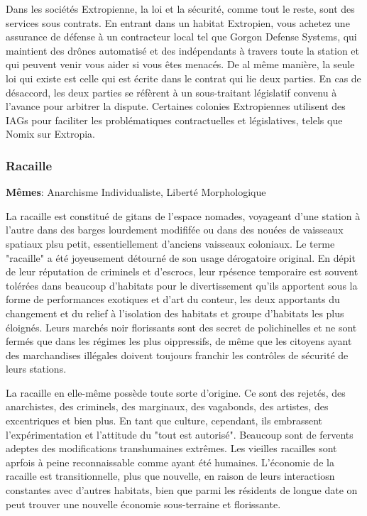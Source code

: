 Dans les sociétés Extropienne, la loi et la sécurité, comme tout le reste, sont des services sous contrats. En entrant dans un habitat Extropien, vous achetez une assurance de défense à un contracteur local tel que Gorgon Defense Systems, qui maintient des drônes automatisé et des indépendants à travers toute la station et qui peuvent venir vous aider si vous êtes menacés. De al même manière, la seule loi qui existe est celle qui est écrite dans le contrat qui lie deux parties. En cas de désaccord, les deux parties se réfèrent à un sous-traitant législatif convenu à l'avance pour arbitrer la dispute. Certaines colonies Extropiennes utilisent des IAGs pour faciliter les problématiques contractuelles et législatives, telels que Nomix sur Extropia. 

\subsubsection{Racaille} \label{sec:scum} 

\textbf{Mêmes}: Anarchisme Individualiste, Liberté Morphologique 

La racaille est constitué de gitans de l'espace nomades, voyageant d'une station à l'autre dans des barges lourdement modififée ou dans des nouées de vaisseaux spatiaux plsu petit, essentiellement d'anciens vaisseaux coloniaux. Le terme "racaille" a été joyeusement détourné de son usage dérogatoire original. En dépit de leur réputation de criminels et d'escrocs, leur rpésence temporaire est souvent tolérées dans beaucoup d'habitats pour le divertissement qu'ils apportent sous la forme de performances exotiques et d'art du conteur, les deux apportants du changement et du relief à l'isolation des habitats et groupe d'habitats les plus éloignés. Leurs marchés noir florissants sont des secret de polichinelles et ne sont fermés que dans les régimes les plus oippressifs, de même que les citoyens ayant des marchandises illégales doivent toujours franchir les contrôles de sécurité de leurs stations. 

La racaille en elle-même possède toute sorte d'origine. Ce sont des rejetés, des anarchistes, des criminels, des marginaux, des vagabonds, des artistes, des excentriques et bien plus. En tant que culture, cependant, ils embrassent l'expérimentation et l'attitude du "tout est autorisé". Beaucoup sont de fervents adeptes des modifications transhumaines extrêmes. Les vieilles racailles sont aprfois à peine reconnaissable comme ayant été humaines. L'économie de la racaille est transitionnelle, plus que nouvelle, en raison de leurs interactiosn constantes avec d'autres habitats, bien que parmi les résidents de longue date on peut trouver une nouvelle économie sous-terraine et florissante. 


